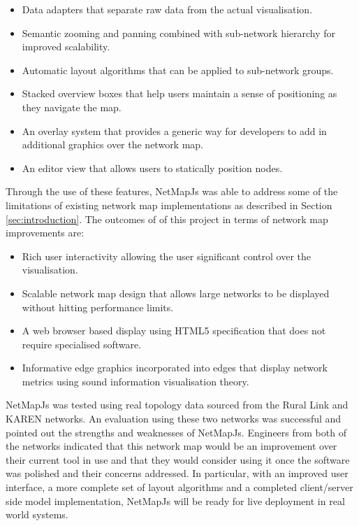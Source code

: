 \documentclass[11pt, a4paper]{article}
\begin{document}
\begin{itemize}
  \item Data adapters that separate raw data from the actual visualisation.
  \item Semantic zooming and panning combined with sub-network hierarchy for
  improved scalability.
  \item Automatic layout algorithms that can be applied to sub-network groups.
  \item Stacked overview boxes that help users maintain a sense of positioning
  as they navigate the map.
  \item An overlay system that provides a generic way for developers to add in
  additional graphics over the network map.
  \item An editor view that allows users to statically position nodes.
\end{itemize}

Through the use of these features, NetMapJs was able to address some of the
limitations of existing network map implementations as described in Section
\ref{sec:introduction}. The outcomes of of this project in terms of network map
improvements are:

\begin{itemize}
  \item Rich user interactivity allowing the user significant control over the
  visualisation.
  \item Scalable network map design that allows large networks to be displayed
  without hitting performance limits.
  \item A web browser based display using HTML5 specification that does not 
  require specialised software.
  \item Informative edge graphics incorporated into edges that display
  network metrics using sound information visualisation theory.
\end{itemize}

NetMapJs was tested using real topology data sourced from the Rural Link and
KAREN networks. An evaluation using these two networks was successful and pointed
out the strengths and weaknesses of NetMapJs. Engineers from both of the
networks indicated that this network map would be an improvement over their
current tool in use and that they would consider using it once the software was
polished and their concerns addressed. In particular, with an improved user
interface, a more complete set of layout algorithms and a completed
client/server side model implementation, NetMapJs will be ready for live
deployment in real world systems.
\end{document}
